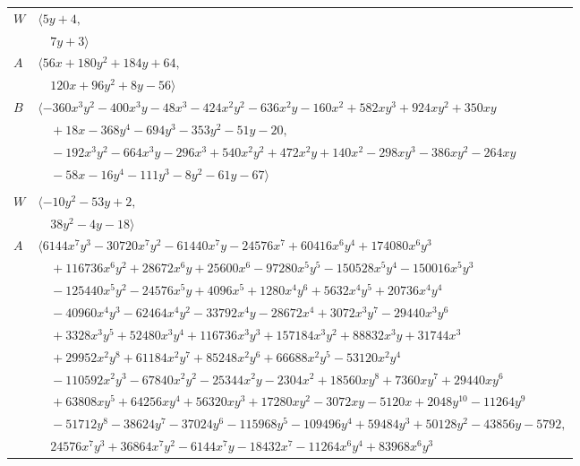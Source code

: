 \documentclass[11pt]{article}
\begin{document}
\begin{longtable}{@{}ll@{}}
$W$ & $\langle 5y+4,$\\
 & $\quad 7y+3\rangle$\\
$A$ & $\langle 56x+180y^{2}+184y+64,$\\
 & $\quad 120x+96y^{2}+8y-56\rangle$\\
$B$ & $\langle -360x^{3}y^{2}-400x^{3}y-48x^{3}-424x^{2}y^{2}-636x^{2}y-160x^{2}+582xy^{3}+924xy^{2}+350xy$\\
 & $\quad +18x-368y^{4}-694y^{3}-353y^{2}-51y-20,$\\
 & $\quad -192x^{3}y^{2}-664x^{3}y-296x^{3}+540x^{2}y^{2}+472x^{2}y+140x^{2}-298xy^{3}-386xy^{2}-264xy$\\
 & $\quad -58x-16y^{4}-111y^{3}-8y^{2}-61y-67\rangle$\\
\addlinespace[2pt]
\multicolumn{2}{@{}p{0.97\textwidth}@{}}{$i=48$, $D_i=8$, $\rho_{ij}$: $4{:}1, \allowbreak 5{:}2, \allowbreak 6{:}2, \allowbreak 18{:}1, \allowbreak 27{:}1, \allowbreak 32{:}1, \allowbreak 34{:}1, \allowbreak 42{:}1, \allowbreak 50{:}2, \allowbreak 51{:}1$}\\
$W$ & $\langle -10y^{2}-53y+2,$\\
 & $\quad 38y^{2}-4y-18\rangle$\\
$A$ & $\langle 6144x^{7}y^{3}-30720x^{7}y^{2}-61440x^{7}y-24576x^{7}+60416x^{6}y^{4}+174080x^{6}y^{3}$\\
 & $\quad +116736x^{6}y^{2}+28672x^{6}y+25600x^{6}-97280x^{5}y^{5}-150528x^{5}y^{4}-150016x^{5}y^{3}$\\
 & $\quad -125440x^{5}y^{2}-24576x^{5}y+4096x^{5}+1280x^{4}y^{6}+5632x^{4}y^{5}+20736x^{4}y^{4}$\\
 & $\quad -40960x^{4}y^{3}-62464x^{4}y^{2}-33792x^{4}y-28672x^{4}+3072x^{3}y^{7}-29440x^{3}y^{6}$\\
 & $\quad +3328x^{3}y^{5}+52480x^{3}y^{4}+116736x^{3}y^{3}+157184x^{3}y^{2}+88832x^{3}y+31744x^{3}$\\
 & $\quad +29952x^{2}y^{8}+61184x^{2}y^{7}+85248x^{2}y^{6}+66688x^{2}y^{5}-53120x^{2}y^{4}$\\
 & $\quad -110592x^{2}y^{3}-67840x^{2}y^{2}-25344x^{2}y-2304x^{2}+18560xy^{8}+7360xy^{7}+29440xy^{6}$\\
 & $\quad +63808xy^{5}+64256xy^{4}+56320xy^{3}+17280xy^{2}-3072xy-5120x+2048y^{10}-11264y^{9}$\\
 & $\quad -51712y^{8}-38624y^{7}-37024y^{6}-115968y^{5}-109496y^{4}+59484y^{3}+50128y^{2}-43856y-5792,$\\
 & $\quad 24576x^{7}y^{3}+36864x^{7}y^{2}-6144x^{7}y-18432x^{7}-11264x^{6}y^{4}+83968x^{6}y^{3}$\\

\end{longtable}
\end{document}
